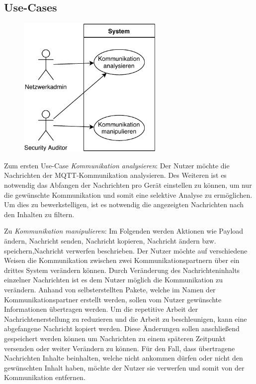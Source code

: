     \subsection{Use-Cases}
    \begin{figure}[h]%
        \centering
        \includegraphics[width=7cm]{tex/bilder/3_anforderungen/Use-Case.pdf}
        \label{fig:use-case}
    \end{figure}
    
    Zum ersten Use-Case \emph{Kommunikation analysieren}:
    	Der Nutzer möchte die Nachrichten der \ac{MQTT}-Kommunikation analysieren.
    	Des Weiteren ist es notwendig das Abfangen der Nachrichten pro Gerät einstellen zu können, um nur die gewünschte Kommunikation und somit eine selektive Analyse zu ermöglichen.
    	Um dies zu bewerkstelligen, ist es notwendig die angezeigten Nachrichten nach den Inhalten zu filtern.
    	
    Zu \emph{Kommunikation manipulieren}:
        Im Folgenden werden Aktionen wie Payload ändern, Nachricht senden, Nachricht kopieren, Nachricht ändern bzw. speichern,Nachricht verwerfen beschrieben.
    	Der Nutzer möchte auf verschiedene Weisen die Kommunikation zwischen zwei Kommunikationspartnern über ein drittes System verändern können.
    	Durch Veränderung des Nachrichteninhalts einzelner Nachrichten ist es dem Nutzer möglich die Kommunikation zu verändern.
    	Anhand von selbsterstellten Pakete, welche im Namen der Kommunikationspartner erstellt werden, sollen vom Nutzer gewünschte Informationen übertragen werden.
    	Um die repetitive Arbeit der Nachrichtenerstellung zu reduzieren und die Arbeit zu beschleunigen, kann eine abgefangene Nachricht kopiert werden.
    	Diese Änderungen sollen anschließend gespeichert werden können um Nachrichten zu einem späteren Zeitpunkt versenden oder weiter Verändern zu können.
    	Für den Fall, dass übertragene Nachrichten Inhalte beinhalten, welche nicht ankommen dürfen oder nicht den gewünschten Inhalt haben, möchte der Nutzer sie verwerfen und somit von der Kommunikation entfernen.

